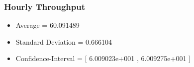 \documentclass[aps,letterpaper,10pt]{revtex4}
\begin{document}
        \subsubsection{Hourly Throughput}
            \begin{itemize}
                \item Average = 60.091489
                \item Standard Deviation = 0.666104
                \item Confidence-Interval = [ 6.009023e+001 , 6.009275e+001 ]
            \end{itemize}
            \begin{figure}[htp]
                \begin{center}
                \end{center}
            \end{figure}
\end{document}

